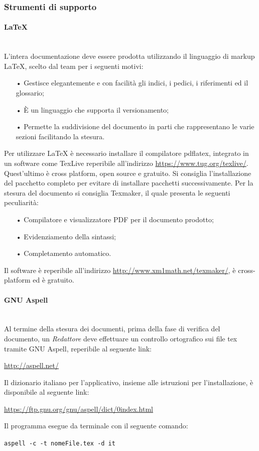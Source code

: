 \subsubsection{Strumenti di supporto} 

\paragraph{\LaTeX{}}\mbox{}\\
L'intera documentazione deve essere prodotta utilizzando il {linguaggio di markup} \LaTeX{}, scelto dal team per i seguenti motivi:
\begin{itemize}
\item[•] Gestisce elegantemente e con facilità gli indici, i pedici, i riferimenti ed il glossario;
\item[•] È un linguaggio che supporta il {versionamento};
\item[•] Permette la suddivisione del documento in parti che rappresentano le varie sezioni facilitando la stesura.
\end{itemize}
Per utilizzare \LaTeX{} è necessario installare il compilatore pdflatex, integrato in un software come TexLive reperibile all'indirizzo  \url{https://www.tug.org/texlive/}. Quest'ultimo è {cross platform}, {open source} e gratuito. Si consiglia l'installazione del pacchetto completo per evitare di installare pacchetti successivamente.
Per la stesura del documento si consiglia Texmaker, il quale presenta le seguenti peculiarità:
\begin{itemize}
	\item[•] Compilatore e visualizzatore {PDF} per il documento prodotto;
	\item[•] Evidenziamento della sintassi;
	\item[•] Completamento automatico.
\end{itemize}  
Il software è reperibile all'indirizzo \url{http://www.xm1math.net/texmaker/}, è cross-platform ed è gratuito.

\paragraph{GNU Aspell}\mbox{}\\
Al termine della stesura dei documenti, prima della fase di verifica del documento, un \textit{Redattore} deve effettuare un controllo ortografico sui file tex tramite GNU Aspell, reperibile al seguente link:
\begin{center}
	\url{http://aspell.net/}
\end{center}
Il dizionario italiano per l'applicativo, insieme alle istruzioni per l'installazione, è disponibile al seguente link:
\begin{center}
	\url{https://ftp.gnu.org/gnu/aspell/dict/0index.html}
\end{center}
Il programma esegue da terminale con il seguente comando:
\begin{center}
	\texttt{aspell -c -t nomeFile.tex -d it}
\end{center}

